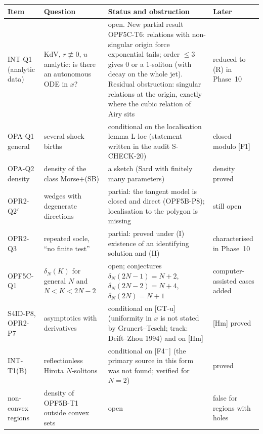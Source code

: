 \documentclass[11pt]{article}
\theoremstyle{plain}
\theoremstyle{definition}
\theoremstyle{remark}
\begin{document}
\begin{center}\small
\begin{longtable}{@{}L{2.6cm}L{3.6cm}L{5.2cm}L{3.0cm}@{}}
\toprule
Item & Question & Status and obstruction & Later\\\midrule\endhead
INT-Q1 (analytic data) & KdV, $r\not\equiv0$, $u$ analytic: is there an autonomous ODE in $x$? & open. New partial result OPF5C-T6: relations with non-singular origin force exponential tails; order $\le3$ gives $0$ or a $1$-soliton (with decay on the whole jet). Residual obstruction: singular relations at the origin, exactly where the cubic relation of Airy sits & reduced to (R) in Phase~10\\
OPA-Q1 general & several shock births & conditional on the localisation lemma L-loc (statement written in the audit S-CHECK-20) & closed modulo [F1]\\
OPA-Q2 density & density of the class Morse$+$(SB) & a sketch (Sard with finitely many parameters) & density proved\\
OPR2-Q2$'$ & wedges with degenerate directions & partial: the tangent model is closed and direct (OPF5B-P8); localisation to the polygon is missing & still open\\
OPR2-Q3 & repeated socle, ``no finite test'' & partial: proved under (I) existence of an identifying solution and (II) & characterised in Phase~10\\
OPF5C-Q1 & $\delta_N(K)$ for general $N$ and $N<K<2N-2$ & open; conjectures $\delta_N(2N-1)=N+2$, $\delta_N(2N-2)=N+4$, $\delta_N(2N)=N+1$ & computer-assisted cases added\\
S4ID-P8, OPR2-P7 & asymptotics with derivatives & conditional on [GT-u] (uniformity in $x$ is not stated by Grunert--Teschl; track: Deift--Zhou 1994) and on [Hm] & [Hm] proved\\
INT-T1(B) & reflectionless Hirota $N$-solitons & conditional on [F4$^-$] (the primary source in this form was not found; verified for $N=2$) & proved\\
non-convex regions & density of OPF5B-T1 outside convex sets & open & false for regions with holes\\
\bottomrule
\end{longtable}
\end{center}
\end{document}
